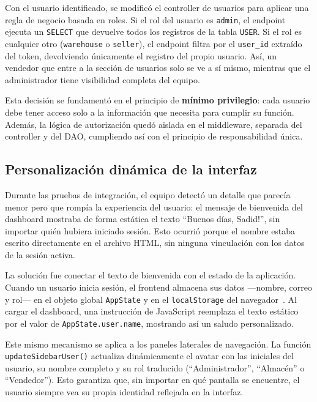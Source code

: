 \documentclass[journal]{IEEEtran}
\begin{document}
	Con el usuario identificado, se modific\'{o} el controller de
	usuarios para aplicar una regla de negocio basada en roles. Si
	el rol del usuario es \texttt{admin}, el endpoint ejecuta un
	\texttt{SELECT} que devuelve todos los registros de la tabla
	\texttt{USER}. Si el rol es cualquier otro
	(\texttt{warehouse} o \texttt{seller}), el endpoint filtra por
	el \texttt{user\_id} extra\'{i}do del token, devolviendo
	\'{u}nicamente el registro del propio usuario. As\'{i}, un
	vendedor que entre a la secci\'{o}n de usuarios solo se ve a
	s\'{i} mismo, mientras que el administrador tiene visibilidad
	completa del equipo.
	
	Esta decisi\'{o}n se fundament\'{o} en el principio de
	\textbf{m\'{i}nimo privilegio}: cada usuario debe tener acceso
	solo a la informaci\'{o}n que necesita para cumplir su funci\'{o}n.
	Adem\'{a}s, la l\'{o}gica de autorizaci\'{o}n qued\'{o}
	aislada en el middleware, separada del controller y del DAO,
	cumpliendo as\'{i} con el principio de responsabilidad
	\'{u}nica.
	
	\subsection{Personalizaci\'{o}n din\'{a}mica de la interfaz}
	\label{subsec:personalizacion}
	
	Durante las pruebas de integraci\'{o}n, el equipo
	detect\'{o} un detalle que parec\'{i}a menor pero que romp\'{i}a
	la experiencia del usuario: el mensaje de bienvenida del
	dashboard mostraba de forma est\'{a}tica el texto ``Buenos
	d\'{i}as, Sadid!'', sin importar qui\'{e}n hubiera
	iniciado sesi\'{o}n. Esto ocurri\'{o} porque el nombre estaba
	escrito directamente en el archivo HTML, sin ninguna
	vinculaci\'{o}n con los datos de la sesi\'{o}n activa.
	
	La soluci\'{o}n fue conectar el texto de bienvenida con el
	estado de la aplicaci\'{o}n. Cuando un usuario inicia
	sesi\'{o}n, el frontend almacena sus datos ---nombre, correo
	y rol--- en el objeto global \texttt{AppState} y en el
	\texttt{localStorage} del navegador~\cite{MDN:2025}. Al
	cargar el dashboard, una instrucci\'{o}n de JavaScript
	reemplaza el texto est\'{a}tico por el valor de
	\texttt{AppState.user.name}, mostrando as\'{i} un saludo
	personalizado.
	
	Este mismo mecanismo se aplica a los paneles laterales de
	navegaci\'{o}n. La funci\'{o}n \texttt{updateSidebarUser()}
	actualiza din\'{a}micamente el avatar con las iniciales del
	usuario, su nombre completo y su rol traducido
	(``Administrador'', ``Almac\'{e}n'' o ``Vendedor''). Esto
	garantiza que, sin importar en qu\'{e} pantalla se encuentre,
	el usuario siempre vea su propia identidad reflejada en la
	interfaz.
	
\end{document}

